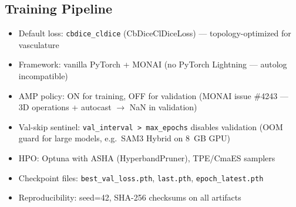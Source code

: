 
\subsection{Training Pipeline}
\begin{itemize}
  \item Default loss: \texttt{cbdice\_cldice} (CbDiceClDiceLoss) --- topology-optimized for vasculature
  \item Framework: vanilla PyTorch + MONAI (no PyTorch Lightning --- autolog incompatible)
  \item AMP policy: ON for training, OFF for validation
        (MONAI issue \#4243 --- 3D operations + autocast $\to$ NaN in validation)
  \item Val-skip sentinel: \texttt{val\_interval > max\_epochs} disables validation
        (OOM guard for large models, e.g.\ SAM3 Hybrid on 8~GB GPU)
  \item HPO: Optuna with ASHA (HyperbandPruner), TPE/CmaES samplers
  \item Checkpoint files: \texttt{best\_val\_loss.pth}, \texttt{last.pth}, \texttt{epoch\_latest.pth}
  \item Reproducibility: seed=42, SHA-256 checksums on all artifacts
\end{itemize}
